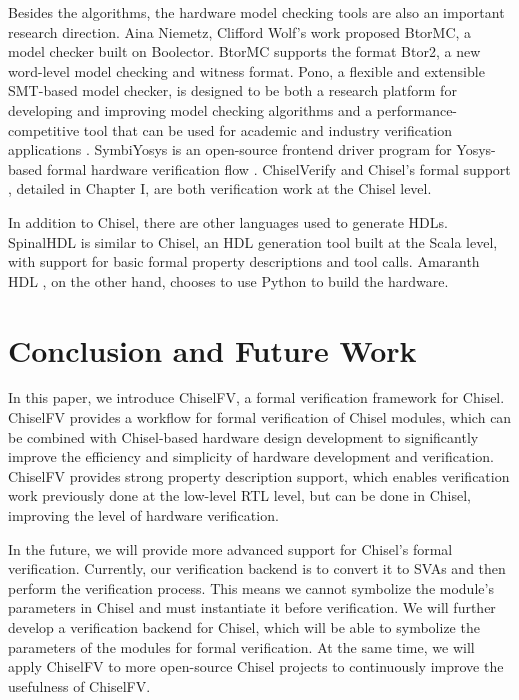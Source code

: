 \documentclass[conference]{IEEEtran}
\theoremstyle{definition}
\begin{document}
Besides the algorithms, the 
hardware model checking tools are also an important research direction. Aina Niemetz, Clifford Wolf's work \cite{niemetz2018btor2} proposed BtorMC, a model checker built on Boolector. BtorMC supports the format Btor2, a new word-level model checking and witness format. Pono, a flexible and extensible SMT-based model checker, is designed to be both a research platform for developing and improving model checking algorithms and a performance-competitive tool that can be used for academic and industry verification applications \cite{mann2021pono}. SymbiYosys is an open-source frontend driver program for Yosys-based formal hardware verification flow \cite{SymbiYosys}.
ChiselVerify \cite{dobis2021chiselverify} and Chisel's formal support \cite{dobis2021open}, detailed in Chapter I, are both verification work at the Chisel level.

In addition to Chisel, there are other languages used to generate HDLs. SpinalHDL \cite{SpinalHDL} is similar to Chisel, an HDL generation tool built at the Scala level, with support for basic formal property descriptions and tool calls. Amaranth HDL \cite{AmaranthHDL}, on the other hand, chooses to use Python to build the hardware.


\section{Conclusion and Future Work}

In this paper, we introduce ChiselFV, a formal verification framework for Chisel. ChiselFV provides a workflow for formal verification of Chisel modules, which can be combined with Chisel-based hardware design development to significantly improve the efficiency and simplicity of hardware development and verification. ChiselFV provides strong property description support, which enables verification work previously done at the low-level RTL level, but can be done in Chisel, improving the level of hardware verification.

In the future, we will provide more advanced support for Chisel's formal verification. Currently, our verification backend is to convert it to SVAs and then perform the verification process. This means we cannot symbolize the module's parameters in Chisel and must instantiate it before verification. We will further develop a verification backend for Chisel, which will be able to symbolize the parameters of the modules for formal verification. 
At the same time, we will apply ChiselFV to more open-source Chisel projects to continuously improve the usefulness of ChiselFV.
\end{document}
